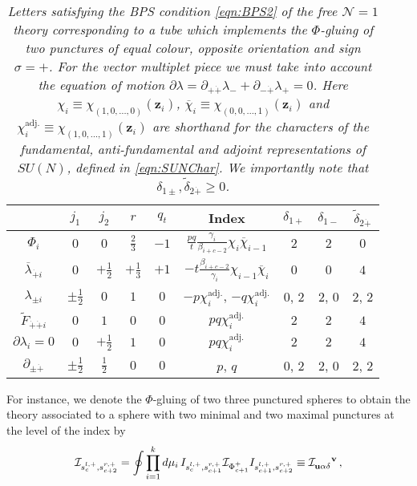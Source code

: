 \documentclass[main.tex]{subfiles}
\begin{document}
\begin{table}
\centering
\begin{tabular}{|c||c|c|c|c|c|c|c|c|} 
\hline
 &  $j_1$ & $j_2$ & $r$ & $q_t$& Index&$\delta_{1+}$&$\delta_{1-}$&$\widetilde{\delta}_{2\dot+}$\\ 
 \hline\hline
  $\Phi_i$ & $0$ & $0$ & $\frac{2}{3}$ &$-1$& $\frac{pq}{t}\frac{\gamma_i}{\beta_{i+c-2}}\chi_i\overline{\chi}_{i-1}$&$2$&$2$&$0$\\ [2pt]
 \hline
     $\overline{\lambda}_{\dot{+}i}$ &  $0$ & $+\frac{1}{2}$ & $+\frac{1}{3}$ &$+1$ & $-t\frac{\beta_{i+c-2}}{\gamma_i}\chi_{i-1}\overline{\chi}_i$&$0$&$0$&$4$\\ [2pt]\hline\hline
   $\lambda_{\pm i}$ & $\pm\frac{1}{2}$ & $0$ & $1$ &$0$& $-p\chi^{\text{adj.}}_i$, $-q\chi^{\text{adj.}}_i$&$0$, $2$&$2$, $0$&$2$, $2$\\ [2pt]
 \hline
  $\widetilde{F}_{\dot+\dot+i}$ &$0$ & $1$ &$0$& $0$ & $pq\chi^{\text{adj.}}_i$&$2$&$2$&$4$\\ [2pt]
 \hline
    $\partial\lambda_i=0$ & $0$ & $+\frac{1}{2}$ & $1$ &$0$ & $pq\chi^{\text{adj.}}_i$&$2$&$2$&$4$\\ [2pt]
 \hline\hline
    $\partial_{\pm\dot+}$ &  $\pm\frac{1}{2}$ & $\frac{1}{2}$ & $0$ &$0$&  $p$, $q$&$0$, $2$&$2$, $0$&$2$, $2$\\[2pt] 
 \hline
\end{tabular}
\caption{\textit{Letters satisfying the BPS condition \eqref{eqn:BPS2} of the free $\mathcal{N}=1$ theory corresponding to a tube which implements the $\Phi$-gluing of two punctures of equal colour, opposite orientation and sign $\sigma=+$. For the vector multiplet piece we must take into account the equation of motion $\partial\lambda=\partial_{+\dot+}\lambda_{-}+\partial_{-\dot+}\lambda_{+}=0$. Here $\chi_i\equiv\chi_{(1,0,\dots,0)}(\mathbf{z}_i)$, $\overline{\chi}_i\equiv\chi_{(0,0,\dots,1)}(\mathbf{z}_i)$ and $\chi^{\text{adj.}}_i\equiv\chi_{(1,0,\dots,1)}(\mathbf{z}_i)$ are shorthand for the characters of the fundamental, anti-fundamental and adjoint representations of $SU(N)$, defined in \eqref{eqn:SUNChar}. We importantly note that $\delta_{1\pm},\widetilde{\delta}_{2\dot+}\geq0$.}}
\label{tab:lettersphi}
\end{table}
For instance, we denote the $\Phi$-gluing of two three punctured spheres to obtain the theory associated to a sphere with two minimal and two maximal punctures at the level of the index by
\begin{equation}\label{eqn:4puncsphereindex}
\mathcal{I}_{s_{c}^{l,+},s_{c+2}^{r,+}}=\oint\prod_{i=1}^kd\mu_i\,I_{s_{c}^{l,+},s_{c+1}^{r,+}}\mathcal{I}_{\Phi_{c+1}^+}I_{s_{c+1}^{l,+},s_{c+2}^{r,+}}\equiv \mathcal{I}\indices{_{\mathbf{u}\alpha\delta}^{\mathbf{v}}}\,,
\end{equation}
\end{document}
